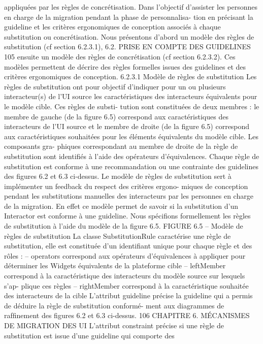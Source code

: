 \documentclass{article}
\begin{document}
appliquées par les règles de concrétisation.
Dans l’objectif d’assister les personnes en charge de la migration pendant la phase de personnalisa-
tion en précisant la guideline et les critères ergonomiques de conception associés à chaque substitution
ou concrétisation. Nous présentons d’abord un modèle des règles de substitution (cf section 6.2.3.1),
6.2. PRISE EN COMPTE DES GUIDELINES
105
ensuite un modèle des règles de concrétisation (cf section 6.2.3.2). Ces modèles permettent de décrire
des règles formelles issues des guidelines et des critères ergonomiques de conception.
6.2.3.1
Modèle de règles de substitution
Les règles de substitution ont pour objectif d’indiquer pour un ou plusieurs interacteur(s) de l’UI
source les caractéristiques des interacteurs équivalents pour le modèle cible. Ces règles de substi-
tution sont constituées de deux membres : le membre de gauche (de la ﬁgure 6.5) correspond aux
caractéristiques des interacteurs de l’UI source et le membre de droite (de la ﬁgure 6.5) correspond
aux caractéristiques souhaitées pour les éléments équivalents du modèle cible. Les composants gra-
phiques correspondant au membre de droite de la règle de substitution sont identiﬁés à l’aide des
opérateurs d’équivalences.
Chaque règle de substitution est conforme à une recommandation ou une contrainte des guidelines
des ﬁgures 6.2 et 6.3 ci-dessus.
Le modèle de règles de substitution sert à implémenter un feedback du respect des critères ergono-
miques de conception pendant les substitutions manuelles des interacteurs par les personnes en charge
de la migration. En effet ce modèle permet de savoir si la substitution d’un Interactor est conforme à
une guideline.
Nous spéciﬁons formellement les règles de substitution à l’aide du modèle de la ﬁgure 6.5.
FIGURE 6.5 – Modèle de règles de substitution
La classe SubstitutionRule
caractérise une règle de substitution, elle est constituée d’un identiﬁant
unique pour chaque règle et des rôles :
– operators correspond aux opérateurs d’équivalences à appliquer pour déterminer les Widgets
équivalents de la plateforme cible
– leftMember correspond à la caractéristique des interacteurs du modèle source sur lesquels s’ap-
plique ces règles
– rightMember correspond à la caractéristique souhaitée des interacteurs de la cible
L’attribut guideline précise la guideline qui a permis de déduire la règle de substitution conformé-
ment aux diagrammes de rafﬁnement des ﬁgures 6.2 et 6.3 ci-dessus.
106
CHAPITRE 6. MÉCANISMES DE MIGRATION DES UI
L’attribut constraint précise si une règle de substitution est issue d’une guideline qui comporte des
\end{document}
